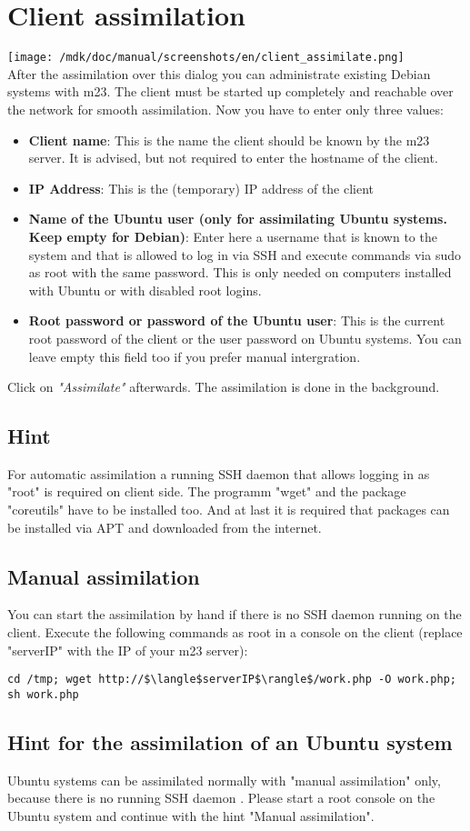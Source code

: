 \section{Client assimilation}
\texttt{[image: /mdk/doc/manual/screenshots/en/client\_assimilate.png]} \\
After the assimilation over this dialog you can administrate existing Debian systems with m23. The client must be started up completely and reachable over the network for smooth assimilation. Now you have to enter only three values:\\
\begin{itemize}
\item \textbf{Client name}: This is the name the client should be known by the m23 server. It is advised, but not required to enter the hostname of the client.\\
\item \textbf{IP Address}: This is the (temporary) IP address of the client\\
\item \textbf{Name of the Ubuntu user (only for assimilating Ubuntu systems. Keep empty for Debian)}: Enter here a username that is known to the system and that is allowed to log in via SSH and execute commands via sudo as root with the same password. This is only needed on computers installed with Ubuntu or with disabled root logins.\\
\item \textbf{Root password or password of the Ubuntu user}: This is the current root password of the client or the user password on Ubuntu systems. You can leave empty this field too if you prefer manual intergration.\\
\end{itemize}
Click on \textit{"Assimilate"} afterwards. The assimilation is done in the background.\\
\subsection{Hint}
For automatic assimilation a running SSH daemon that allows logging in as "root" is required on client side. The programm "wget" and the package "coreutils" have to be installed too. And at last it is required that packages can be installed via APT and downloaded from the internet.\\
\subsection{Manual assimilation}
You can start the assimilation by hand if there is no SSH daemon running on the client. Execute the following commands as root in a console on the client (replace "serverIP" with the IP of your m23 server):\\
\begin{verbatim}
cd /tmp; wget http://$\langle$serverIP$\rangle$/work.php -O work.php; sh work.php
\end{verbatim}
\subsection{Hint for the assimilation of an Ubuntu system}
Ubuntu systems can be assimilated normally with "manual assimilation" only, because there is no running SSH daemon . Please start a root console on the Ubuntu system and continue with the hint "Manual assimilation".\\
